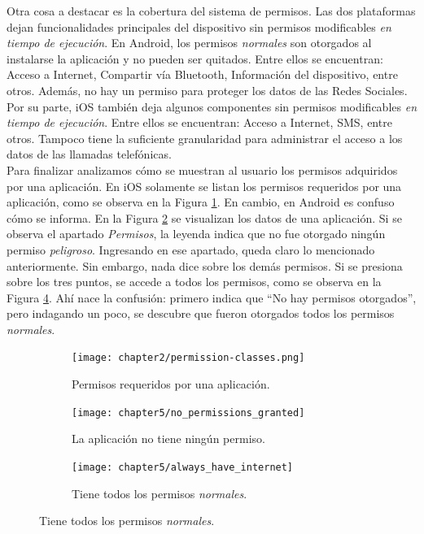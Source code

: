 Otra cosa a destacar es la cobertura del sistema de permisos. Las dos plataformas dejan funcionalidades principales del dispositivo sin permisos modificables \emph{en tiempo de ejecución}. En Android, los permisos \emph{normales} son otorgados al instalarse la aplicación y no pueden ser quitados. Entre ellos se encuentran: Acceso a Internet, Compartir vía Bluetooth, Información del dispositivo, entre otros. Además, no hay un permiso para proteger los datos de las Redes Sociales. Por su parte, iOS también deja algunos componentes sin permisos modificables \emph{en tiempo de ejecución}. Entre ellos se encuentran: Acceso a Internet, SMS, entre otros. Tampoco tiene la suficiente granularidad para administrar el acceso a los datos de las llamadas telefónicas.\\

Para finalizar analizamos cómo se muestran al usuario los permisos adquiridos por una aplicación. En iOS solamente se listan los permisos requeridos por una aplicación, como se observa en la Figura \ref{fig:ch05:ios_all_permissions}. En cambio, en Android es confuso cómo se informa. En la Figura \ref{fig:ch05:without_permissions} se visualizan los datos de una aplicación. Si se observa el apartado \emph{Permisos}, la leyenda indica que no fue otorgado ningún permiso \emph{peligroso}. Ingresando en ese apartado, queda claro lo mencionado anteriormente. Sin embargo, nada dice sobre los demás permisos. Si se presiona sobre los tres puntos, se accede a todos los permisos, como se observa en la Figura \ref{fig:ch05:always_have_internet}. Ahí nace la confusión: primero indica que ``No hay permisos otorgados'', pero indagando un poco, se descubre que fueron otorgados todos los permisos \emph{normales}.
\begin{figure}[hbtp]
	\centering
	\begin{subfigure}{.3\linewidth}
		\texttt{[image: chapter2/permission-classes.png]}
		\caption{Permisos requeridos por una aplicación.}
		\label{fig:ch05:ios_all_permissions}
	\end{subfigure}
	\begin{subfigure}{.3\linewidth}
		\texttt{[image: chapter5/no\_permissions\_granted]}
		\caption{La aplicación no tiene ningún permiso.}
		\label{fig:ch05:without_permissions}
	\end{subfigure}
	\begin{subfigure}{.3\linewidth}
		\texttt{[image: chapter5/always\_have\_internet]}
		\caption{Tiene todos los permisos \emph{normales}.}
		\label{fig:ch05:always_have_internet}
	\end{subfigure}
\end{figure}